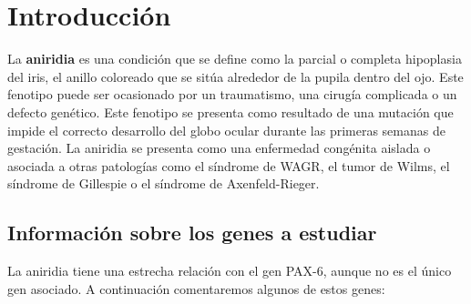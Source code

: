 \section{Introducción}


La \textbf{aniridia} es una condición que se define como la parcial o completa hipoplasia del iris, el anillo coloreado que se sitúa alrededor de la pupila dentro del ojo. Este fenotipo puede ser ocasionado por un traumatismo, una cirugía complicada o un defecto genético. 
Este fenotipo se presenta como resultado de una mutación que impide el correcto desarrollo del globo ocular durante las primeras semanas de gestación. La aniridia se presenta como una enfermedad congénita aislada o asociada a otras patologías como el síndrome de WAGR, el tumor de Wilms, el síndrome de Gillespie o el síndrome de Axenfeld-Rieger. \cite{Landsend2021} \cite{Romano2023}

\subsection{Información sobre los genes a estudiar}

La aniridia tiene una estrecha relación con el gen PAX-6, aunque no es el único gen asociado. A continuación comentaremos algunos de estos genes: 

